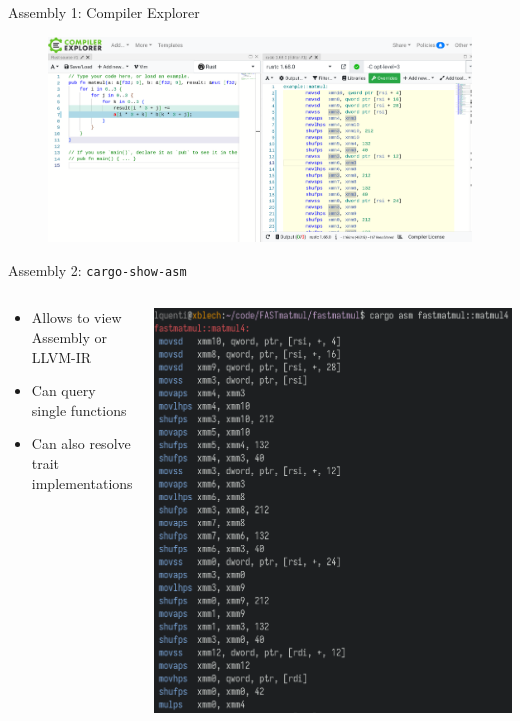 \documentclass[compress,aspectratio=169]{beamer}
\begin{document}
\begin{frame}{Assembly 1: Compiler Explorer \cite{godbolt}}
  \begin{figure}[h]
    \includegraphics[width=\textwidth]{../assets/compilerexplorer.png}
  \end{figure}
\end{frame}

\begin{frame}{Assembly 2: \texttt{cargo-show-asm} \cite{cargo-asm}}
  \begin{columns}
    \begin{column}{0.5\textwidth}
      \begin{itemize}
        \item Allows to view Assembly or LLVM-IR
        \item Can query single functions
        \item Can also resolve trait implementations
      \end{itemize}
    \end{column}
    \begin{column}{0.5\textwidth}
    \includegraphics[height=.9\textheight]{../assets/cargoasm.png}
    \end{column}
  \end{columns}
\end{frame}
\end{document}
